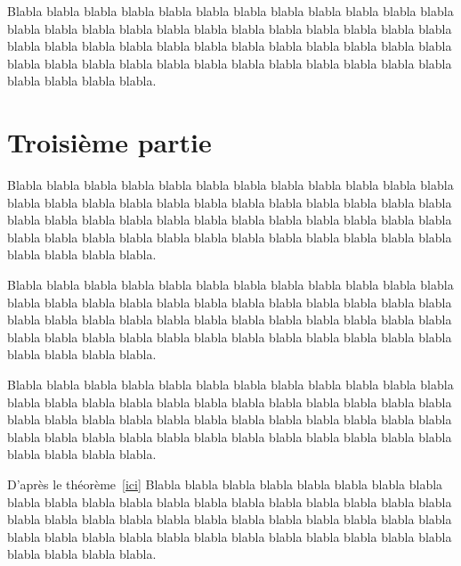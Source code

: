 \documentclass{article}
\begin{document}
Blabla blabla blabla blabla blabla blabla blabla blabla blabla blabla blabla blabla blabla
blabla blabla blabla blabla blabla blabla blabla blabla blabla blabla blabla blabla blabla
blabla blabla blabla blabla blabla blabla blabla blabla blabla blabla blabla blabla blabla
blabla blabla blabla blabla blabla blabla blabla blabla blabla blabla blabla blabla blabla.


\section{Troisième partie}

Blabla blabla blabla blabla blabla blabla blabla blabla blabla blabla blabla blabla blabla
blabla blabla blabla blabla blabla blabla blabla blabla blabla blabla blabla blabla blabla
blabla blabla blabla blabla blabla blabla blabla blabla blabla blabla blabla blabla blabla
blabla blabla blabla blabla blabla blabla blabla blabla blabla blabla blabla blabla blabla.

Blabla blabla blabla blabla blabla blabla blabla blabla blabla blabla blabla blabla blabla
blabla blabla blabla blabla blabla blabla blabla blabla blabla blabla blabla blabla blabla
blabla blabla blabla blabla blabla blabla blabla blabla blabla blabla blabla blabla blabla
blabla blabla blabla blabla blabla blabla blabla blabla blabla blabla blabla blabla blabla.

Blabla blabla blabla blabla blabla blabla blabla blabla blabla blabla blabla blabla blabla
blabla blabla blabla blabla blabla blabla blabla blabla blabla blabla blabla blabla blabla
blabla blabla blabla blabla blabla blabla blabla blabla blabla blabla blabla blabla blabla
blabla blabla blabla blabla blabla blabla blabla blabla blabla blabla blabla blabla blabla.

D'après le théorème~\ref{ici} Blabla blabla blabla blabla blabla blabla blabla blabla blabla
blabla blabla blabla blabla blabla blabla blabla blabla blabla blabla blabla blabla blabla
blabla blabla blabla blabla blabla blabla blabla blabla blabla blabla blabla blabla blabla
blabla blabla blabla blabla blabla blabla blabla blabla blabla blabla blabla blabla blabla.
\end{document}
